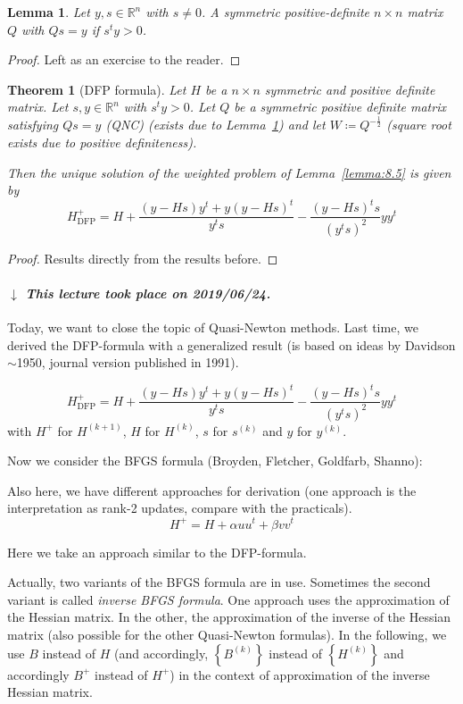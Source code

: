 \documentclass[a4paper]{article}
\newcounter{lecref}[subsection]
\numberwithin{lecref}{subsection}
\newtheorem{theorem}[lecref]{Theorem}
\newtheorem{lemma}[lecref]{Lemma}
\newcommand{\Set}[1]{\left\{#1\right\}}
\newcommand{\dateref}[1]{%
  \begin{mdframed}[backgroundcolor=gray!10,innerbottommargin=0pt,innertopmargin=0pt]
    \paragraph{\textit{$\downarrow$ This lecture took place on #1.}}%
  \end{mdframed}%
}
\begin{document}
\begin{lemma}
	\label{lemma:8.6}
	Let $y, s \in \mathbb R^n$ with $s \neq 0$. A symmetric positive-definite $n \times n$ matrix $Q$ with $Q s = y$ if $s^t y > 0$.
\end{lemma}

\begin{proof}
	Left as an exercise to the reader.
\end{proof}

\begin{theorem}[DFP formula]
	\label{theorem:8.7}
	Let $H$ be a $n \times n$ symmetric and positive definite matrix. Let $s, y \in \mathbb R^n$ with $s^t y > 0$.
	Let $Q$ be a symmetric positive definite matrix satisfying $Qs = y$ (QNC) (exists due to Lemma~\ref{lemma:8.6}) and let $W \coloneqq Q^{-\frac12}$ (square root exists due to positive definiteness).

	Then the unique solution of the weighted problem of Lemma~\ref{lemma:8.5} is given by
	\[ H_{\text{DFP}}^+ = H + \frac{(y - Hs)y^t + y (y - Hs)^t}{y^t s} - \frac{(y - Hs)^t s}{(y^ts)^2} yy^t \]
\end{theorem}

\begin{proof}
	Results directly from the results before.
\end{proof}

\dateref{2019/06/24}


Today, we want to close the topic of Quasi-Newton methods.
Last time, we derived the DFP-formula with a generalized result (is based on ideas by Davidson $\sim$1950, journal version published in 1991).

\[ H_{\text{DFP}}^+ = H + \frac{(y - Hs)y^t + y(y - Hs)^t}{y^t s} - \frac{(y - Hs)^t s}{(y^t s)^2} yy^t \]
with $H^+$ for $H^{(k+1)}$, $H$ for $H^{(k)}$, $s$ for $s^{(k)}$ and $y$ for $y^{(k)}$.

Now we consider the BFGS formula (Broyden, Fletcher, Goldfarb, Shanno):

Also here, we have different approaches for derivation (one approach is the interpretation as rank-2 updates, compare with the practicals).
\[ H^+ = H + \alpha uu^t + \beta vv^t \]


Here we take an approach similar to the DFP-formula.

Actually, two variants of the BFGS formula are in use.
Sometimes the second variant is called \emph{inverse BFGS formula}.
One approach uses the approximation of the Hessian matrix. In the other, the approximation of the inverse of the Hessian matrix (also possible for the other Quasi-Newton formulas).
In the following, we use $B$ instead of $H$ (and accordingly, $\Set{B^{(k)}}$ instead of $\Set{H^{(k)}}$ and accordingly $B^+$ instead of $H^+$) in the context of approximation of the inverse Hessian matrix.
\end{document}
